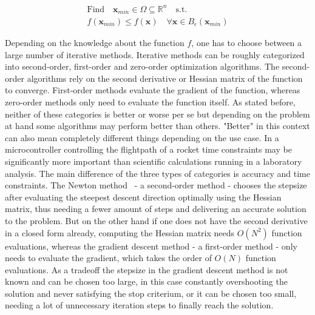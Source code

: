 \documentclass[a4paper,10pt]{article}
\renewcommand{\vec}[1]{\mathbf{#1}}
\begin{document}
    \begin{equation}
        \label{equ:optimization_local}
        \begin{gathered}
        \text{Find} \quad \vec{x}_{min} \in \Omega \subseteq \mathbb{R}^n \quad \text{s.t.}\\
        f(\vec{x}_{min}) \leq f(\vec{x}) \quad \forall \vec{x} \in B_{\epsilon}(\vec{x}_{min})
        \end{gathered} 
    \end{equation}

    Depending on the knowledge about the function $f$, one has to choose
    between a large number of iterative methods.
    Iterative methods can be roughly categorized into second-order, 
    first-order and zero-order optimization algorithms.
    The second-order algorithms rely on the second derivative or
    Hessian matrix of the function to converge.
    First-order methods evaluate the gradient of the function, whereas
    zero-order methods only need to evaluate the function itself.
    As stated before, neither of these categories is better or worse
    per se but depending on the problem at hand some algorithms
    may perform better than others.
    "Better" in this context can also mean completely different things
    depending on the use case.
    In a microcontroller controlling the flightpath of a rocket
    time constraints may be significantly more important than
    scientific calculations running in a laboratory analysis.
    The main difference of the three types of categories is accuracy
    and time constraints.
    The Newton method~\cite{solomon_numerical} - a second-order method -
    chooses the stepsize after evaluating the steepest descent
    direction optimally using the Hessian matrix, thus needing
    a fewer amount of steps and delivering an accurate solution to
    the problem.
    But on the other hand if one does not have the second derivative
    in a closed form already,
    computing the Hessian matrix needs $O(N^2)$
    function evaluations, whereas the gradient descent method
    - a first-order method - only needs to evaluate the gradient, which
    takes the order of $O(N)$ function evaluations.
    As a tradeoff the stepsize in the gradient descent method is not
    known and can be chosen too large, in this case constantly
    overshooting the solution and never satisfying the stop
    criterium, or it can be chosen too small, needing a lot of
    unnecessary iteration steps to finally reach the solution.
    
\end{document}
